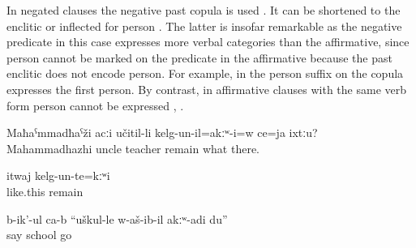 In negated clauses the negative past copula  is used . It can be shortened to the enclitic   or inflected for person . The latter is insofar remarkable as the negative predicate in this case expresses more verbal categories than the affirmative, since person cannot be marked on the predicate in the affirmative because the past enclitic does not encode person. For example, in  the person suffix on the copula expresses the first person. By contrast, in affirmative clauses with the same verb form person cannot be expressed , .
%
\begin{exe}
	\ex	\label{ex:Mahammadhazhi was not working as a teacher or what there (in Sanzhi) analytic}
	\gll	Maħaˁmmadħaˁži	acːi	učitil-li	kelg-un-il=akːʷ-i=w	ce=ja	ixtːu?\\
		Mahammadhazhi	uncle	teacher	remain	what	there.\\
	\glt	{} 
	
	\ex	\label{ex:It was not like this analytic}
	\gll	itwaj	kelg-un-te=kːʷi\\
		like.this	remain\\
	\glt	{}

	\ex	\label{ex:‎‎(The wolf) said, I did not go to school analytic}
	\gll	b-ik'-ul	ca-b	``uškul-le	w-aš-ib-il		akːʷ-adi	du''\\
		say		school	go		\\
	\glt	{}

\end{exe}
